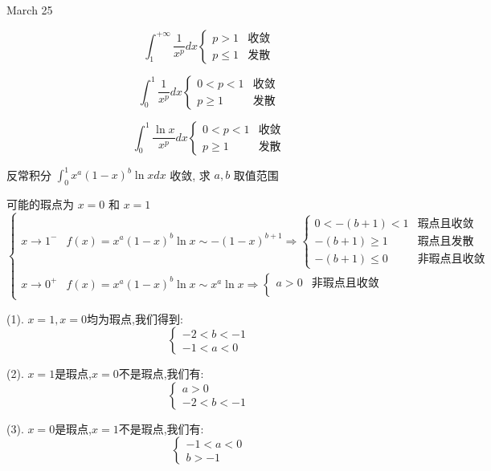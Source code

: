 \textcolor{purplea}{March 25}

\begin{lemma}[特殊反常积分]
	
	$$\int_{1}^{+\infty}\dfrac{1}{x^p}dx 
	\begin{cases}
		p > 1 & \text{收敛}\\
		p\leq 1 & \text{发散}
	\end{cases}$$

	$$\int_{0}^{1}\dfrac{1}{x^p}dx
	\begin{cases}
		0 < p < 1 & \text{收敛}\\
		p\geq 1  & \text{发散}
	\end{cases}$$

	$$\int_{0}^{1}\dfrac{\ln x}{x^p}dx
	\begin{cases}
		0 < p < 1 & \text{收敛}\\
		p\geq 1 & \text{发散}
	\end{cases}$$
\end{lemma}
\begin{example}[][Exam: 29.4.7]
	反常积分 $\int_{0}^{1}x^{a}(1-x)^{b}\ln xdx$ 收敛, 求 $a,b$ 取值范围
\end{example}

\begin{solution}
	
	可能的瑕点为 $x=0$ 和  $x=1$
	$$\begin{cases}
	  x\to 1^{-} & f(x) = x^{a}(1-x)^{b}\ln x \sim -(1-x)^{b+1}\Rightarrow 
	  \begin{cases}
		0 < -(b+1) < 1 & \text{瑕点且收敛}\\
		-(b+1) \geq 1 & \text{瑕点且发散}\\
		-(b+1) \leq 0 & \text{非瑕点且收敛}	
	  \end{cases} \\
	  x\to 0^{+} & f(x) = x^{a}(1-x)^{b}\ln x \sim x^{a}\ln x\Rightarrow
	  \begin{cases}
		a > 0 & \text{非瑕点且收敛}\\
		
	  \end{cases}
	\end{cases}$$
	
	(1). $x=1,x=0$均为瑕点,我们得到: 
	$$\left\lbrace 
	\begin{array}{l}
		-2<b<-1\\
		-1<a<0
	\end{array}
	\right. $$
	
	(2). $x=1$是瑕点,$x=0$不是瑕点,我们有: 
	$$\left\lbrace 
	\begin{array}{l}
		a>0\\-2<b<-1
	\end{array}
	\right. $$
	
	(3). $x=0$是瑕点,$x=1$不是瑕点,我们有: 
	$$\left\lbrace 
	\begin{array}{l}
		-1<a<0\\b>-1
	\end{array}
	\right. $$
\end{solution}

